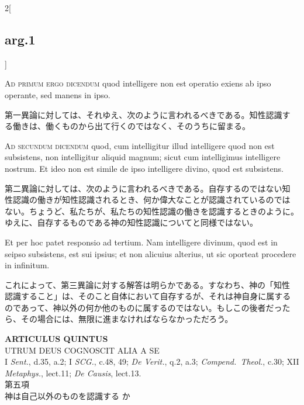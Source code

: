 \documentclass[paper=a4paper,fontsize=10pt,jafontsize=9pt,titlepage]{jlreq}
\begin{document}
\begin{paracol}{2}[\subsection{arg.1}]
\switchcolumn*[\subsection{ad.1}]

{\scshape Ad primum ergo dicendum} quod intelligere non est operatio
exiens ab ipso operante, sed manens in ipso.

\switchcolumn

第一異論に対しては、それゆえ、次のように言われるべきである。知性認識す
る働きは、働くものから出て行くのではなく、そのうちに留まる。

\switchcolumn*[\subsection{ad.2}]

{\scshape Ad secundum dicendum} quod, cum intelligitur illud
intelligere quod non est subsistens, non intelligitur aliquid magnum;
sicut cum intelligimus intelligere nostrum. Et ideo non est simile de
ipso intelligere divino, quod est subsistens.

\switchcolumn

第二異論に対しては、次のように言われるべきである。自存するのではない知
性認識の働きが知性認識されるとき、何か偉大なことが認識されているのでは
ない。ちょうど、私たちが、私たちの知性認識の働きを認識するときのように。
ゆえに、自存するものである神の知性認識についてと同様ではない。

\switchcolumn*

Et per hoc patet responsio ad tertium. Nam intelligere divinum, quod
est in seipso subsistens, est sui ipsius; et non alicuius alterius, ut
sic oporteat procedere in infinitum.

\switchcolumn

これによって、第三異論に対する解答は明らかである。すなわち、神の「知性
認識すること」は、そのこと自体において自存するが、それは神自身に属する
のであって、神以外の何か他のものに属するのではない。もしこの後者だった
ら、その場合には、無限に進まなければならなかっただろう。

\end{paracol}


\newpage



{}
\setcounter{section}{5}
\setcounter{subsection}{0}
\begin{center}
{\Large {\bfseries ARTICULUS QUINTUS}}\\ {\large UTRUM DEUS COGNOSCIT ALIA A
SE}\\ {\footnotesize I {\itshape Sent.}, d.35, a.2; I {\itshape
SCG.}, c.48, 49; {\itshape De Verit.}, q.2, a.3; {\itshape
Compend.~Theol.}, c.30; XII {\itshape Metaphys.}, lect.11; {\itshape
De Causis}, lect.13.}\\ {\Large 第五項\\神は自己以外のものを認識する
か}
\end{center}
\end{document}
